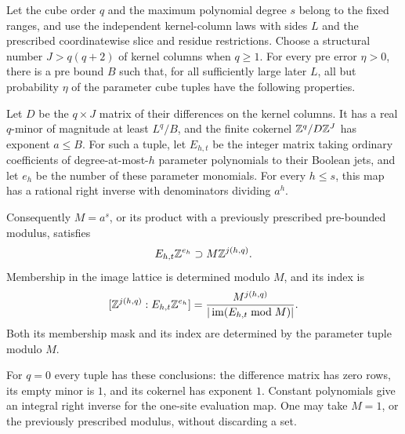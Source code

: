 \begin{lemma}
\label{cube:kernel-covers}
Let the cube order $q$ and the maximum polynomial degree $s$
belong to the fixed ranges, and use the independent kernel-column
laws with sides $L$ and the prescribed coordinatewise slice and
residue restrictions. Choose a structural number $J>q(q+2)$
of kernel columns when $q\ge1$.
For every pre error $\eta>0$, there is a pre bound $B$ such that,
for all sufficiently large later $L$, all but probability $\eta$
of the parameter cube tuples have the following properties.

Let $D$ be the $q\times J$ matrix of their differences on the
kernel columns. It has a real $q$-minor of magnitude at least
$L^q/B$, and the finite cokernel
$\mathbb Z^q/D\mathbb Z^J$ has exponent $a\le B$.
For such a tuple, let $E_{h,t}$ be the integer matrix taking
ordinary coefficients of degree-at-most-$h$ parameter
polynomials to their Boolean jets, and let $e_h$ be the number
of these parameter monomials. For every $h\le s$,
this map has a rational right inverse with denominators
dividing $a^h$.

Consequently $M=a^s$, or its product with a previously prescribed
pre-bounded modulus, satisfies
\[
                  E_{h,t}\mathbb Z^{e_h}\supset M\mathbb Z^{j(h,q)}.
\]
Membership in the image lattice is determined modulo $M$, and
its index is
\[
       [\mathbb Z^{j(h,q)}:E_{h,t}\mathbb Z^{e_h}]
        =\frac{M^{j(h,q)}}{|\operatorname{im}(E_{h,t}\bmod M)|}.
\]
Both its membership mask and its index are determined by the
parameter tuple modulo $M$.

For $q=0$ every tuple has these conclusions: the difference
matrix has zero rows, its empty minor is $1$, and its cokernel
has exponent $1$. Constant polynomials give an integral right
inverse for the one-site evaluation map. One may take $M=1$,
or the previously prescribed modulus, without discarding a set.
\end{lemma}

